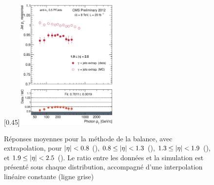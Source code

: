 \begin{figure}[p]
    \subcaptionbox{\label{fig:bal_extrap_eta1925}}[0.45\textwidth]{\includegraphics[width=0.45\textwidth]{chapitre4/figs/resp_balancing_extrap/response_eta1925_balancing_extrap.eps}}
    \caption{Réponses moyennes pour la méthode de la balance, avec extrapolation, pour $\lvert \eta \rvert < \num{0.8}$ (), $\num{0.8} \leq \lvert \eta \rvert < \num{1.3}$ (), $\num{1.3} \leq \lvert \eta \rvert < \num{1.9}$ (), et $\num{1.9} \leq \lvert \eta \rvert < \num{2.5}$ (). Le ratio entre les données et la simulation est présenté sous chaque distribution, accompagné d'une interpolation linéaire constante (ligne grise)}
    \label{fig:balancing_extrap_resp}
\end{figure}

